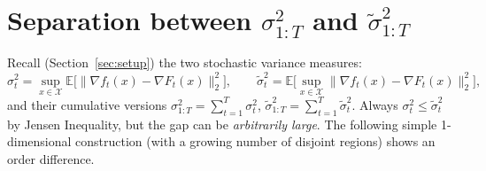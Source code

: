 \documentclass{article}
\theoremstyle{plain}
\theoremstyle{definition}
\theoremstyle{remark}
\newcommand{\cX}{\mathcal{X}}
\renewcommand{\Bbb}{\mathbb}
\newcommand{\E}{{\Bbb E}}
\renewcommand{\tilde}{\widetilde}
\begin{document}

\newpage
\appendix



\section{Separation between $\sigma_{1:T}^2$ and $\tilde{\sigma}_{1:T}^2$}
\label{app:separation}

Recall (Section~\ref{sec:setup}) the two stochastic variance measures:
\[
\sigma_t^2=\sup_{x\in\cX}\E\big[\|\nabla f_t(x)-\nabla F_t(x)\|_2^2\big], \qquad
\tilde{\sigma}_t^2=\E\Big[\sup_{x\in\cX}\|\nabla f_t(x)-\nabla F_t(x)\|_2^2\Big],
\]
and their cumulative versions $\sigma_{1:T}^2=\sum_{t=1}^T \sigma_t^2$, $\tilde{\sigma}_{1:T}^2=\sum_{t=1}^T \tilde{\sigma}_t^2$. Always $\sigma_t^2 \le \tilde{\sigma}_t^2$ by Jensen Inequality, but the gap can be \emph{arbitrarily large}. The following simple 1-dimensional construction (with a growing number of disjoint regions) shows an order difference.
\end{document}
